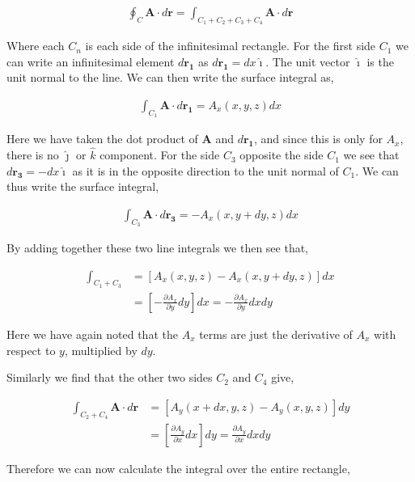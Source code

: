 \documentclass[11pt]{amsart}
\begin{document}
\begin{align*}
  \oint_C \mathbf{A} \cdot d\mathbf{r} = \int_{C_1 + C_2 + C_3 + C_4} \mathbf{A} \cdot d\mathbf{r}
\end{align*}

Where each $C_n$ is each side of the infinitesimal rectangle. For the first side $C_1$ we can write an infinitesimal element $d\mathbf{r_1}$ as $d\mathbf{r_1} = dx \hat{\imath}$. The unit vector $\hat{\imath}$ is the unit normal to the line. We can then write the surface integral as,

\begin{align*}
  \int_{C_1} \mathbf{A} \cdot d\mathbf{r_1} = A_x(x, y, z) dx
\end{align*}

Here we have taken the dot product of $\mathbf{A}$ and $d\mathbf{r_1}$, and since this is only for $A_x$, there is no $\hat{\jmath}$ or $\hat{k}$ component. For the side $C_3$ opposite the side $C_1$ we see that $d\mathbf{r_3} = -dx \hat{\imath}$ as it is in the opposite direction to the unit normal of $C_1$. We can thus write the surface integral,

\begin{align*}
  \int_{C_3} \mathbf{A} \cdot d\mathbf{r_3} = -A_x(x, y + dy, z) dx
\end{align*}

By adding together these two line integrals we then see that,

\begin{align*}
  \int_{C_1 + C_3} &= \left[A_x(x, y, z) - A_x(x, y + dy, z)\right] dx \\
                   &= \left[-\frac{\partial A_x}{\partial y} dy\right] dx = -\frac{\partial A_x}{\partial y} dx dy
\end{align*}

Here we have again noted that the $A_x$ terms are just the derivative of $A_x$ with respect to $y$, multiplied by $dy$.

Similarly we find that the other two sides $C_2$ and $C_4$ give,

\begin{align*}
  \int_{C_2 + C_4} \mathbf{A} \cdot d\mathbf{r} &= \left[A_y(x + dx, y, z) - A_y(x, y, z)\right] dy \\
                                                &= \left[\frac{\partial A_y}{\partial x} dx\right] dy = \frac{\partial A_y}{\partial x} dx dy
\end{align*}

Therefore we can now calculate the integral over the entire rectangle,
\end{document}

